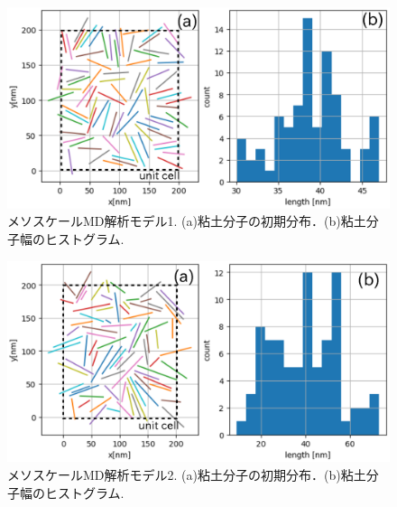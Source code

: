 \begin{figure}[h]
	\begin{center}
	\includegraphics[width=0.8\linewidth]{Figs/fig1.eps} 
	\end{center}
	\caption{
		メソスケールMD解析モデル1. (a)粘土分子の初期分布．(b)粘土分子幅のヒストグラム. 
	} 
	\label{fig:fig1}
\end{figure}
\begin{figure}[h]
	\begin{center}
	\includegraphics[width=0.8\linewidth]{Figs/fig2.eps} 
	\end{center}
	\caption{
		メソスケールMD解析モデル2. (a)粘土分子の初期分布．(b)粘土分子幅のヒストグラム. 
	} 
	\label{fig:fig2}
\end{figure}
